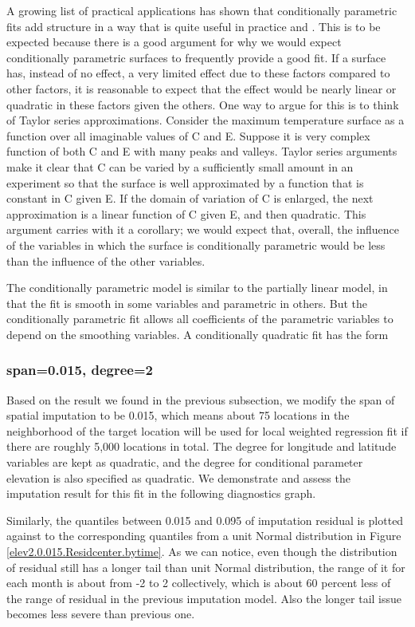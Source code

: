 A growing list of practical applications has shown that conditionally parametric
fits add structure in a way that is quite useful in practice 
\cite{cleveland1991computational} and \cite{hastie1990generalized}. This is to be
expected because there is a good argument for why we would expect conditionally
parametric surfaces to frequently provide a good fit. If a surface has, instead
of no effect, a very limited effect due to these factors compared to other factors,
it is reasonable to expect that the effect would be nearly linear or quadratic
in these factors given the others. One way to argue for this is to think of Taylor
series approximations. Consider the maximum temperature surface as a function 
over all imaginable values of C and E. Suppose it is very complex function of both
C and E with many peaks and valleys. Taylor series arguments make it clear that
C can be varied by a sufficiently small amount in an experiment so that the 
surface is well approximated by a function that is constant in C given E. If the
domain of variation of C is enlarged, the next approximation is a linear function
of C given E, and then quadratic. This argument carries with it a corollary; we 
would expect that, overall, the influence of the variables in which the surface
is conditionally parametric would be less than the influence of the other 
variables. 

The conditionally parametric model is similar to the partially linear model,
in that the fit is smooth in some variables and parametric in others. But
the conditionally parametric fit allows all coefficients of the parametric
variables to depend on the smoothing variables. A conditionally quadratic
fit has the form

\subsubsection{span=0.015, degree=2}

Based on the result we found in the previous subsection, we modify the span of 
spatial imputation to be 0.015, which means about 75 locations in the neighborhood
of the target location will be used for local weighted regression fit if there 
are roughly 5,000 locations in total. The degree for longitude and latitude 
variables are kept as quadratic, and the degree for conditional parameter 
elevation is also specified as quadratic. We demonstrate and assess the imputation
result for this fit in the following diagnostics graph.

Similarly, the quantiles between 0.015 and 0.095 of imputation residual is plotted 
against to the corresponding quantiles from a unit Normal distribution in Figure
\href{../plots/a1950/spaimpute/elev/d2/span0.015/a1950.spaResidcenter.bytime.pdf}
{\ref*{elev2.0.015.Residcenter.bytime}}. As we can notice, even though the 
distribution of residual still has a longer tail than unit Normal distribution,
the range of it for each month is about from -2 to 2 collectively, which is about 
60 percent less of the range of residual in the previous imputation model. Also
the longer tail issue becomes less severe than previous one.

